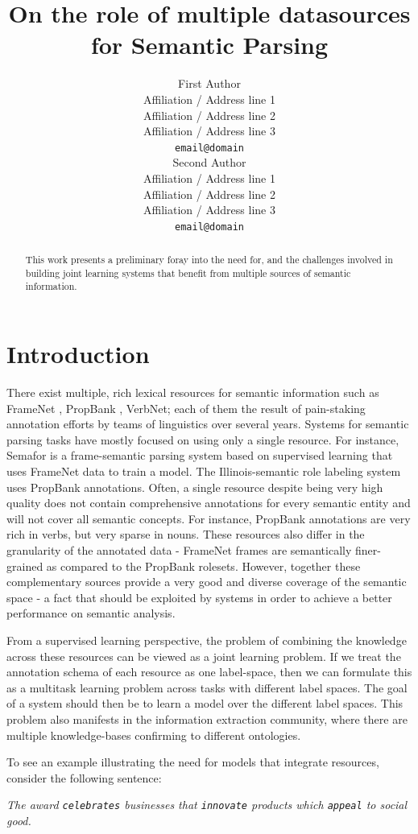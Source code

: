 \documentclass[11pt]{article}
\title{On the role of multiple datasources for Semantic Parsing}
\author{First Author \\
  Affiliation / Address line 1 \\
  Affiliation / Address line 2 \\
  Affiliation / Address line 3 \\
  {\tt email@domain} \\\And
  Second Author \\
  Affiliation / Address line 1 \\
  Affiliation / Address line 2 \\
  Affiliation / Address line 3 \\
  {\tt email@domain} \\}
\date{}
\begin{document}
\maketitle
\begin{abstract}
This work presents a preliminary foray into the need for, and the challenges involved in building joint learning systems that benefit from multiple sources of semantic information.
\end{abstract}

\section{Introduction}
There exist multiple, rich lexical resources for semantic information such as FrameNet \cite{framenet}, PropBank \cite{propbank}, VerbNet\cite{vnet}; each of them the result of pain-staking annotation efforts by teams of linguistics over several years. Systems for semantic parsing tasks have mostly focused on using only a single resource. For instance, Semafor \cite{semafor} is a frame-semantic parsing system based on supervised learning that uses FrameNet data to train a model. The Illinois-semantic role labeling system \cite{illinoisSRL} uses PropBank annotations. Often, a single resource despite being very high quality does not contain comprehensive annotations for every semantic entity and will not cover all semantic concepts. For instance, PropBank annotations are very rich in verbs, but very sparse in nouns. These resources also differ in the granularity of the annotated data - FrameNet frames are semantically finer-grained as compared to the PropBank rolesets. However, together these complementary sources provide a very good and diverse coverage of the semantic space - a fact that should be exploited by systems in order to achieve a better performance on semantic analysis. 

From a supervised learning perspective, the problem of combining the knowledge across these resources can be viewed as a joint learning problem. If we treat the annotation schema of each resource as one label-space, then we can formulate this as a multitask learning problem across tasks with different label spaces. The goal of a system should then be to learn a model over the different label spaces. This problem also manifests in the information extraction community, where there are multiple knowledge-bases confirming to different ontologies.  

To see an example illustrating the need for models that integrate resources, consider the following sentence:
\begin{center}
\textit{The award \texttt{celebrates} businesses that \texttt{innovate} products which \texttt{appeal} to social good.}
\end{center}
\end{document}

